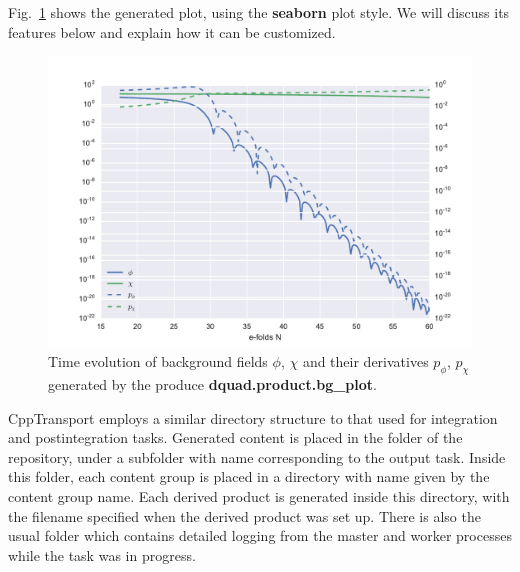 \documentclass[11pt,a4paper]{article}
\renewcommand{\texttt}[1]{{\ttfamily\fontseries{l}\selectfont{#1}}}
\newcommand{\repoobject}[1]{{\ttfamily\bfseries\small #1}}
\newcommand{\packagefont}{\sffamily}
\newcommand{\CppTransport}{{\packagefont CppTransport}}
\newcommand{\file}[1]{\texttt{{#1}}}
\newcommand{\option}[1]{{\ttfamily\bfseries\small #1}}
\begin{document}
Fig.~\ref{fig:background-plot} shows the generated plot, using the
\option{seaborn} plot style.
We will discuss its features below and explain how it can be customized.
\begin{figure}
	\begin{center}
		\includegraphics[scale=0.6]{Outputs/background}	
	\end{center}
	\caption{\label{fig:background-plot}Time evolution of background fields $\phi$, $\chi$ and their
	derivatives $p_\phi$, $p_\chi$ generated by the produce
	\repoobject{dquad.product.bg\_plot}.}
\end{figure}

{\CppTransport} employs a similar directory structure to that
used for integration and postintegration tasks.
Generated content is placed in the \file{output} folder of the repository,
under a subfolder with name corresponding to the output task.
Inside this folder, each content group
is placed in a directory with name given by the content group name.
Each derived product is generated inside this directory, with the filename
specified when the derived product was set up.
There is also the usual \file{logs} folder which contains detailed logging
from the master and worker processes while the task was in progress.
\end{document}
